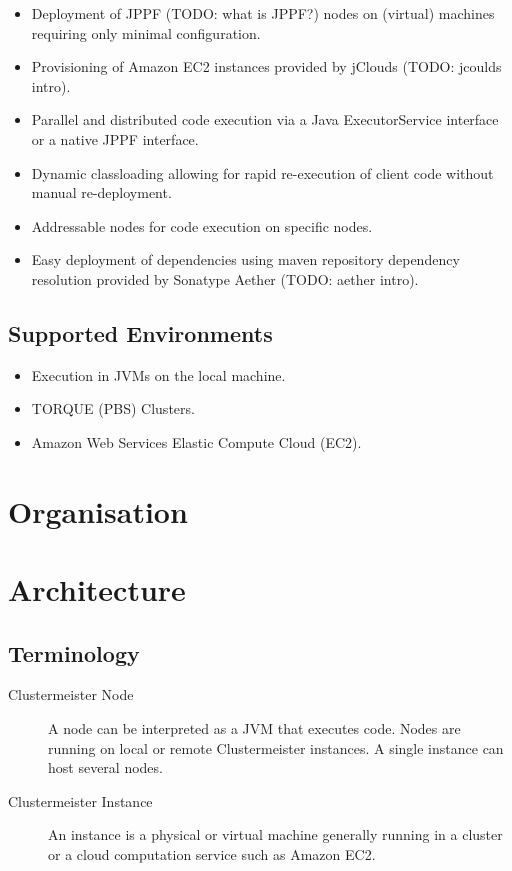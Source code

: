 \documentclass{article}
\begin{document}
\begin{itemize}
\item Deployment of JPPF (TODO: what is JPPF?) nodes on (virtual) machines requiring only minimal configuration.
\item Provisioning of Amazon EC2 instances provided by jClouds (TODO: jcoulds intro).
\item Parallel and distributed code execution via a Java ExecutorService interface or a native JPPF interface.
\item Dynamic classloading allowing for rapid re-execution of client code without manual re-deployment.
\item Addressable nodes for code execution on specific nodes.
\item Easy deployment of dependencies using maven repository dependency resolution provided by Sonatype Aether (TODO: aether intro).
\end{itemize}

\subsection{Supported Environments}
\begin{itemize}
\item Execution in JVMs on the local machine.
\item TORQUE (PBS) Clusters.
\item Amazon Web Services Elastic Compute Cloud (EC2).
\end{itemize}

\section{Organisation}



\section{Architecture}

\subsection{Terminology}

\begin{description}
\item[Clustermeister Node] A node can be interpreted as a JVM that executes code. Nodes are running on local or remote Clustermeister instances. A single instance can host several nodes.
\item[Clustermeister Instance] An instance is a physical or virtual machine generally running in a cluster or a cloud computation service such as Amazon EC2.
\end{description}
\end{document}
